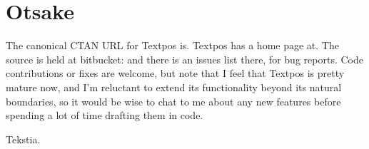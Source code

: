 \documentclass[twoside,a4paper]{article}
\begin{document}
\section{Otsake}
The canonical CTAN URL for Textpos is.
Textpos has a home page at. The
source is held at bitbucket: and there
is an issues list there, for bug reports. Code contributions or fixes are welcome,
but note that I feel that Textpos is pretty mature now, and I’m reluctant to extend
its functionality beyond its natural boundaries, so it would be wise to chat to me
about any new features before spending a lot of time drafting them in code.




\newpage

Tekstia.
\end{document}
